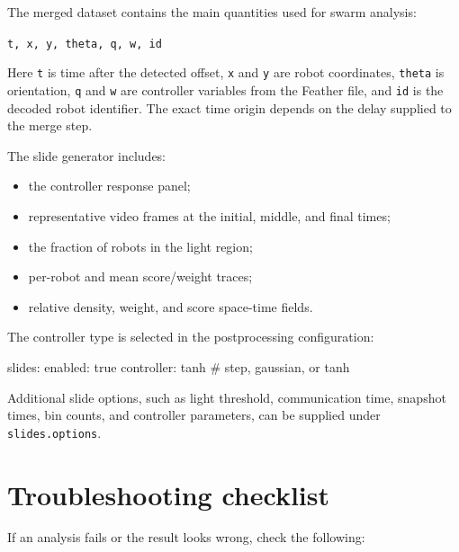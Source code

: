 \documentclass[11pt,a4paper]{article}
\begin{document}
The merged dataset contains the main quantities used for swarm analysis:

\begin{center}
\texttt{t, x, y, theta, q, w, id}
\end{center}

Here \texttt{t} is time after the detected offset, \texttt{x} and \texttt{y} are robot coordinates, \texttt{theta} is orientation, \texttt{q} and \texttt{w} are controller variables from the Feather file, and \texttt{id} is the decoded robot identifier. The exact time origin depends on the delay supplied to the merge step.

The slide generator includes:
\begin{itemize}
  \item the controller response panel;
  \item representative video frames at the initial, middle, and final times;
  \item the fraction of robots in the light region;
  \item per-robot and mean score/weight traces;
  \item relative density, weight, and score space-time fields.
\end{itemize}

The controller type is selected in the postprocessing configuration:

\begin{codeblock}
slides:
  enabled: true
  controller: tanh       # step, gaussian, or tanh
\end{codeblock}

Additional slide options, such as light threshold, communication time, snapshot times, bin counts, and controller parameters, can be supplied under \texttt{slides.options}.

\section{Troubleshooting checklist}

If an analysis fails or the result looks wrong, check the following:
\end{document}
